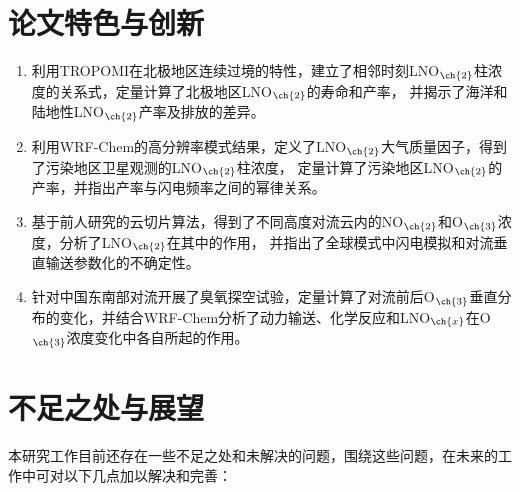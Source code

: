 \section{论文特色与创新}

\begin{enumerate}[label=（\arabic*）, labelindent=\parindent, nosep, leftmargin=0pt, widest=0, itemindent=*, topsep=0pt, partopsep=0pt, parsep=0pt]

\item 利用TROPOMI在北极地区连续过境的特性，建立了相邻时刻LNO$_{\ch{2}}$柱浓度的关系式，定量计算了北极地区LNO$_{\ch{2}}$的寿命和产率，
并揭示了海洋和陆地性LNO$_{\ch{2}}$产率及排放的差异。

\item 利用WRF-Chem的高分辨率模式结果，定义了LNO$_{\ch{2}}$大气质量因子，得到了污染地区卫星观测的LNO$_{\ch{2}}$柱浓度，
定量计算了污染地区LNO$_{\ch{2}}$的产率，并指出产率与闪电频率之间的幂律关系。

\item 基于前人研究的云切片算法，得到了不同高度对流云内的NO$_{\ch{2}}$和O$_{\ch{3}}$浓度，分析了LNO$_{\ch{2}}$在其中的作用，
并指出了全球模式中闪电模拟和对流垂直输送参数化的不确定性。

\item 针对中国东南部对流开展了臭氧探空试验，定量计算了对流前后O$_{\ch{3}}$垂直分布的变化，并结合WRF-Chem分析了动力输送、化学反应和LNO$_{\ch{x}}$在O$_{\ch{3}}$浓度变化中各自所起的作用。

\end{enumerate}



\section{不足之处与展望}

本研究工作目前还存在一些不足之处和未解决的问题，围绕这些问题，在未来的工作中可对以下几点加以解决和完善：

